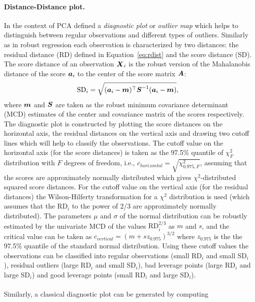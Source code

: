 \documentclass[article,shortnames, nojss]{jss}
\newcommand{\vv}[1]{\mbox{\boldmath$#1$}}
\begin{document}
\paragraph{Distance-Distance plot.} In the context of PCA \cite{hubert-ROBPCA:2005}
defined a \emph{diagnostic plot} or \emph{outlier map} which
helps to distinguish between regular observations and
different types of outliers. Similarly as in robust regression \cite[see][]{Rousseeuw-van-Zomeren}
each observation is characterized by two distances: the residual distance (RD) defined in Equation~\ref{eq:rdist}
and the score distance (SD). The score distance of an observation $\vv{X}_i$
is the robust version of the Mahalanobis distance of the score $\vv{a}_i$
to the center of the score matrix $\vv{A}$:
\begin{equation}
\label{sdist}
\mbox{SD}_i=\sqrt{(\vv{a}_i - \vv{m})^\top \vv{S}^{-1}(\vv{a}_i - \vv{m})} ,
\end{equation}
where $\vv{m}$ and $\vv{S}$ are taken as the robust minimum
covariance determinant (MCD) estimates of the center and
covariance matrix of the scores respectively.
The diagnostic plot is constructed by plotting
the score distances on the horizontal axis, the residual
distances on the vertical axis and drawing two cutoff lines
which will help to classify the observations. The cutoff value on the
horizontal axis (for the score distances) is taken as the 97.5\% quantile of
$\chi^2_F$ distribution with $F$ degrees of freedom, i.e., $c_{horizontal}=\sqrt{\chi^2_{0.975, F}}$,
assuming that the scores are approximately normally distributed which gives
$\chi^2$-distributed squared score distances. For the cutoff value on the
vertical axis (for the residual distances) the Wilson-Hilferty transformation for a $\chi^2$ distribution
is used (which assumes that the $\text{RD}_i$ to the power of 2/3 are approximately
normally distributed). The parameters $\mu$ and $\sigma$ of the
normal distribution can be robustly estimated by the univariate MCD of the
values $\text{RD}_i^{2/3}$ as $m$ and $s$, and the critical value can be taken as
$c_{vertical}=(m + sz_{0.975})^{3/2}$ where $z_{0.975}$ is
the the 97.5\% quantile of the standard normal distribution.
Using these cutoff values the observations can be classified into regular observations
(small RD$_i$ and small SD$_i$), residual outliers (large RD$_i$ and small SD$_i$),
bad leverage points (large RD$_i$ and large SD$_i$) and good leverage points
(small RD$_i$ and large SD$_i$). \\\\
Similarly, a classical diagnostic plot can be generated by computing
\end{document}
